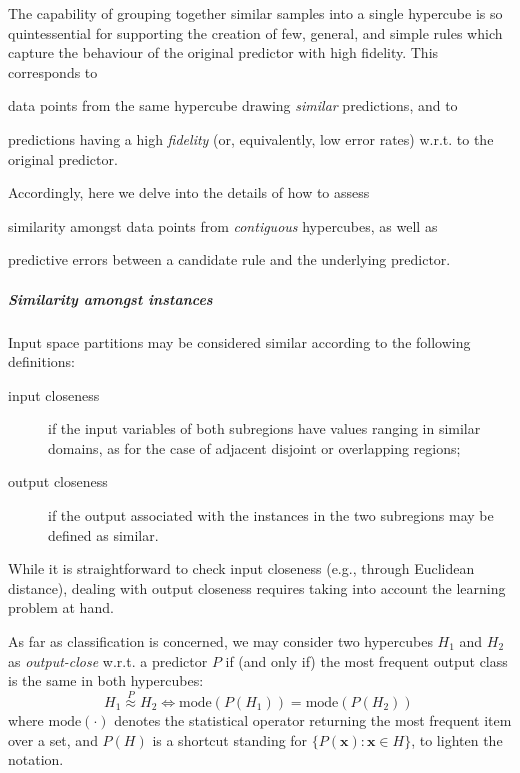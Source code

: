 \documentclass[
]{ceurart}
\begin{document}
The capability of grouping together similar samples into a single hypercube is so quintessential for supporting the creation of few, general, and simple rules which capture the behaviour of the original predictor with high fidelity.
%
This corresponds to
%
\begin{inlinelist}
	\item data points from the same hypercube drawing \emph{similar} predictions, and to
	\item predictions having a high \emph{fidelity} (or, equivalently, low error rates) w.r.t. to the original predictor.
\end{inlinelist}
%
Accordingly, here we delve into the details of how to assess
%
\begin{inlinelist}
	\item similarity amongst data points from \emph{contiguous} hypercubes, as well as
	\item predictive errors between a candidate rule and the underlying predictor.
\end{inlinelist}
%

\subparagraph{Similarity amongst instances}

Input space partitions may be considered similar according to the following definitions:
%
\begin{description}
	\item[input closeness] if the input variables of both subregions have values ranging in similar domains, as for the case of adjacent disjoint or overlapping regions;
	\item[output closeness] if the output associated with the instances in the two subregions may be defined as similar.
\end{description}
%
While it is straightforward to check input closeness (e.g., through Euclidean distance), dealing with output closeness requires taking into account the learning problem at hand.

As far as classification is concerned, we may consider two hypercubes $H_1$ and $H_2$ as \emph{output-close} w.r.t. a predictor $P$ if (and only if) the most frequent output class is the same in both hypercubes:
%
\begin{equation}\label{eq:simClass}
	H_1 \stackrel{P}{\approx} H_2 \Leftrightarrow \text{mode}(P(H_1)) = \text{mode}(P(H_2))\,
\end{equation}
%
where $\text{mode}(\cdot)$ denotes the statistical operator returning the most frequent item over a set, and $P(H)$ is a shortcut standing for $\{ P(\textbf{x}) : \textbf{x} \in H \}$, to lighten the notation.
\end{document}

